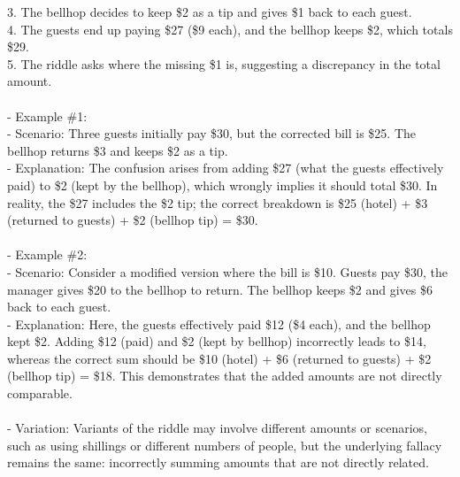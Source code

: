 \documentclass[a4paper,12pt,single,pdftex]{scrartcl}
\begin{document}
    
        3. The bellhop decides to keep \$2 as a tip and gives \$1 back to each guest.
    \\

    
        4. The guests end up paying \$27 (\$9 each), and the bellhop keeps \$2, which totals \$29.
    \\

    
        5. The riddle asks where the missing \$1 is, suggesting a discrepancy in the total amount.
    \\

    
      
    \\

    
      - Example \#1:
    \\

    
        - Scenario: Three guests initially pay \$30, but the corrected bill is \$25. The bellhop returns \$3 and keeps \$2 as a tip.
    \\

    
        - Explanation: The confusion arises from adding \$27 (what the guests effectively paid) to \$2 (kept by the bellhop), which wrongly implies it should total \$30. In reality, the \$27 includes the \$2 tip; the correct breakdown is \$25 (hotel) + \$3 (returned to guests) + \$2 (bellhop tip) = \$30.
    \\

    
      
    \\

    
      - Example \#2:
    \\

    
        - Scenario: Consider a modified version where the bill is \$10. Guests pay \$30, the manager gives \$20 to the bellhop to return. The bellhop keeps \$2 and gives \$6 back to each guest.
    \\

    
        - Explanation: Here, the guests effectively paid \$12 (\$4 each), and the bellhop kept \$2. Adding \$12 (paid) and \$2 (kept by bellhop) incorrectly leads to \$14, whereas the correct sum should be \$10 (hotel) + \$6 (returned to guests) + \$2 (bellhop tip) = \$18. This demonstrates that the added amounts are not directly comparable.
    \\

    
      
    \\

    
      - Variation: Variants of the riddle may involve different amounts or scenarios, such as using shillings or different numbers of people, but the underlying fallacy remains the same: incorrectly summing amounts that are not directly related.
    \\
\end{document}
